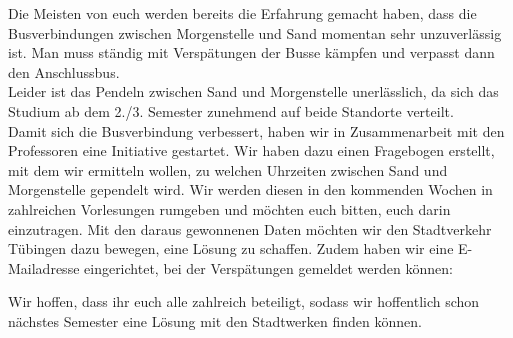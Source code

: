 Die Meisten von euch werden bereits die Erfahrung gemacht haben, dass die Busverbindungen zwischen Morgenstelle und Sand momentan sehr unzuverlässig ist. Man muss ständig mit Verspätungen der Busse kämpfen und verpasst dann den Anschlussbus.\\
Leider ist das Pendeln zwischen Sand und Morgenstelle unerlässlich, da sich das Studium ab dem 2./3. Semester zunehmend auf beide Standorte verteilt.\\
Damit sich die Busverbindung verbessert, haben wir in  Zusammenarbeit mit den Professoren eine Initiative gestartet. Wir haben dazu einen Fragebogen erstellt, mit dem wir ermitteln wollen, zu welchen Uhrzeiten zwischen Sand und Morgenstelle gependelt wird. Wir werden diesen in den kommenden Wochen in zahlreichen Vorlesungen rumgeben und möchten euch bitten, euch darin einzutragen. Mit den daraus gewonnenen Daten möchten wir den Stadtverkehr Tübingen dazu bewegen, eine Lösung zu schaffen.
Zudem haben wir eine E-Mailadresse eingerichtet, bei der Verspätungen gemeldet werden können: 

Wir hoffen, dass ihr euch alle zahlreich beteiligt, sodass wir hoffentlich schon nächstes Semester eine Lösung mit den Stadtwerken finden können.